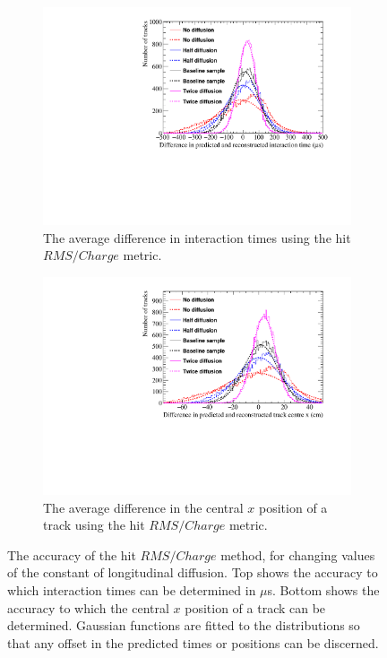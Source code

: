 \begin{figure}[h!]
  \centering
  \begin{subfigure}{0.6\textwidth}
    \centering
    \includegraphics[width=\textwidth]{Canvas_AvDiff_T_RMS_Q_Diffusion}
    \caption{The average difference in interaction times using the hit $RMS/Charge$ metric.}
    \label{fig:DiffLDiff_AvDiff_RMS_Int_T}
  \end{subfigure}
  \begin{subfigure}{0.6\textwidth}
    \centering
    \includegraphics[width=\textwidth]{Canvas_AvDiff_X_RMS_Q_Diffusion}
    \caption{The average difference in the central $x$ position of a track using the hit $RMS/Charge$ metric.}
    \label{fig:DiffLDiff_AvDiff_RMS_Int_X}
  \end{subfigure}
  \caption[Comparing the accuracy of the hit $RMS$ method, as the constant of longitudinal diffusion changes]
          {The accuracy of the hit $RMS/Charge$ method, for changing values of the constant of longitudinal diffusion. Top shows the accuracy to which interaction times can be determined in $\mu$s. Bottom shows the accuracy to which the central $x$ position of a track can be determined. Gaussian functions are fitted to the distributions so that any offset in the predicted times or positions can be discerned.}
  \label{fig:DiffLDiff_AvDiff_RMS_Int}
\end{figure}

